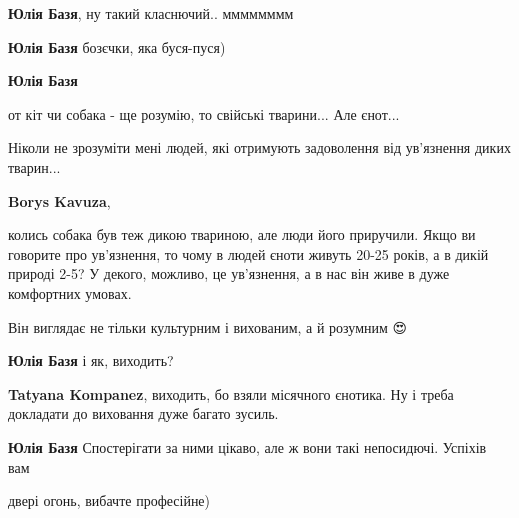 \begin{itemize}
\begin{itemize}
\textbf{Юлія Базя}, ну такий класнючий.. мммммммм

\end{itemize} %

\textbf{Юлія Базя} бозєчки, яка буся-пуся)

\textbf{Юлія Базя} 

от кіт чи собака - ще розумію, то свійські тварини... Але єнот...

Ніколи не зрозуміти мені людей, які отримують задоволення від ув'язнення диких тварин...

\begin{itemize} %
\textbf{Borys Kavuza}, 

колись собака був теж дикою твариною, але люди його приручили. Якщо ви говорите
про ув'язнення, то чому в людей єноти живуть 20-25 років, а в дикій природі
2-5? У декого, можливо, це ув'язнення, а в нас він живе в дуже комфортних
умовах.

\end{itemize} %


Він виглядає не тільки культурним і вихованим, а й розумним 😍

\textbf{Юлія Базя} і як, виходить?

\begin{itemize} %
\textbf{Tatyana Kompanez}, виходить, бо взяли місячного єнотика. Ну і треба докладати до виховання дуже багато зусиль.

\textbf{Юлія Базя} Спостерігати за ними цікаво, але ж вони такі непосидючі. Успіхів вам
\end{itemize} %

\end{itemize} %


двері огонь, вибачте професійне)

